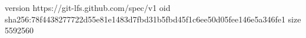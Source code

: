 version https://git-lfs.github.com/spec/v1
oid sha256:78f4438277722d55e81e1483d7fbd31b5fbd45f1c6ee50d05fee146e5a346fe1
size 5592560

